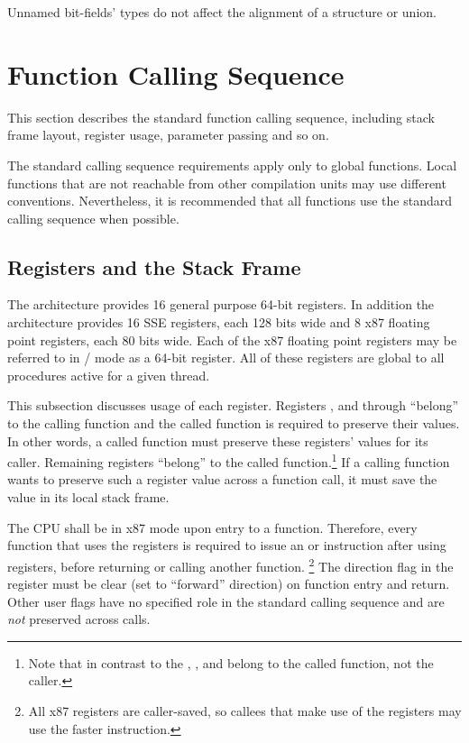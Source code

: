 Unnamed bit-fields' types do not affect the alignment of a structure
or union.


\section{Function Calling Sequence}

This section describes the standard function calling sequence,
including stack frame layout, register usage, parameter passing and so
on.

The standard calling sequence requirements apply only to global
functions.  Local functions that are not reachable from other
compilation units may use different conventions.  Nevertheless, it is
recommended that all functions use the standard calling sequence when
possible.

\subsection{Registers and the Stack Frame}
\label{subsec-registers}

The \xARCH architecture provides 16 general purpose 64-bit registers.
In addition the architecture provides 16 SSE registers, each 128 bits
wide and 8 x87 floating point registers, each 80 bits wide.  Each of
the x87 floating point registers may be referred to in \MMX/\threednow
mode as a 64-bit register.  All of these registers are global to all
procedures active for a given thread.

This subsection discusses usage of each register.  Registers \RBP, \RBX and
 through  ``belong'' to the calling function and the
called function is required to preserve their values.  In other words,
a called function must preserve these registers' values for its
caller.  Remaining registers ``belong'' to the called
function.\footnote{Note that in contrast to the \intelabi, \RDI,
  and \RSI belong to the called function, not the caller.}  If a
calling function wants to preserve such a register value across a
function call, it must save the value in its local stack frame.

The CPU shall be in x87 mode upon entry to a function.  Therefore,
every function that uses the \MMX registers is required to issue an
 or  instruction after using \MMX registers, before
returning or calling another function.  \footnote{All x87 registers
are caller-saved, so callees that make use of the \MMX registers may
use the faster  instruction.}  The direction flag  in the
 register must be clear (set to ``forward'' direction) on function
entry and return.  Other user flags have no specified role in the
standard calling sequence and are {\em not} preserved across calls.

